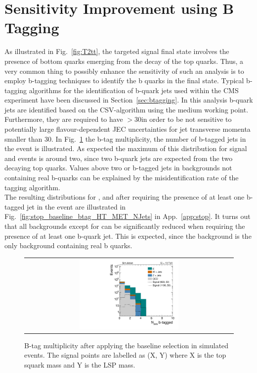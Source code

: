 \section{Sensitivity Improvement using B Tagging}
\label{sec:stop_btagging}
As illustrated in Fig.~\ref{fig:T2tt}, the targeted signal final state involves the presence of bottom quarks emerging from the decay of the top quarks. Thus, a very common thing to possibly enhance the sensitivity of such an analysis is to employ b-tagging techniques to identify the b quarks in the final state. Typical b-tagging algorithms for the identification of b-quark jets used within the CMS experiment have been discussed in Section~\ref{sec:btagging}. In this analysis b-quark jets are identified based on the CSV-algorithm using the medium working point. Furthermore, they are required to have \pt$> 30$\gev in order to be not sensitive to potentially large flavour-dependent JEC uncertainties for jet transverse momenta smaller than 30\gev. In Fig.~\ref{fig:stop_baseline_btag} the b-tag multiplicity, \ie the number of b-tagged jets in the event is illustrated. As expected the maximum of this distribution for signal and \ttbar events is around two, since two b-quark jets are expected from the two decaying top quarks. Values above two or b-tagged jets in backgrounds not containing real b-quarks can be explained by the misidentification rate of the tagging algorithm. \\     
The resulting distributions for \HT, \met and \NJets after requiring the presence of at least one b-tagged jet in the event are illustrated in Fig.~\ref{fig:stop_baseline_btag_HT_MET_NJets} in App.~\ref{app:stop}. It turns out that all backgrounds except for \ttbar can be significantly reduced when requiring the presence of at least one b-quark jet. This is expected, since the \ttbar background is the only background containing real b quarks. \\    
\begin{figure}[!t]
  \centering
  \begin{tabular}{c}
                \includegraphics[width=0.49\textwidth]{figures/Stop_DeltaPhiSelection_N_jets_btagged.pdf} 
  \end{tabular}
  \caption{B-tag multiplicity after applying the baseline selection in simulated events. The signal points are labelled as (X, Y) where X is the top squark mass and Y is the LSP mass.}
  \label{fig:stop_baseline_btag}
\end{figure}
